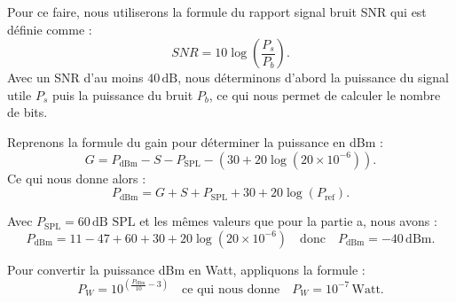 Pour ce faire, nous utiliserons la formule du rapport signal bruit SNR qui est définie comme :
\begin{equation}
SNR = 10 \log \left( \frac{P_s}{P_b} \right).
\end{equation}
Avec un SNR d'au moins \( 40 \, \text{dB} \), nous déterminons d'abord la puissance du signal utile \( P_s \) puis la puissance du bruit \( P_b \), ce qui nous permet de calculer le nombre de bits.

Reprenons la formule du gain pour déterminer la puissance en dBm :
\begin{equation}
G = P_{\text{dBm}} - S - P_{\text{SPL}} - \left( 30 + 20 \log \left( 20 \times 10^{-6} \right) \right).
\end{equation}
Ce qui nous donne alors :
\begin{equation}
P_{\text{dBm}} = G + S + P_{\text{SPL}} + 30 + 20 \log(P_{\text{ref}}).
\end{equation}

Avec \( P_{\text{SPL}} = 60 \, \text{dB SPL} \) et les mêmes valeurs que pour la partie a, nous avons :
\begin{equation}
P_{\text{dBm}} = 11 - 47 + 60 + 30 + 20 \log(20 \times 10^{-6}) \quad \text{donc} \quad P_{\text{dBm}} = -40 \, \text{dBm}.
\end{equation}

Pour convertir la puissance dBm en Watt, appliquons la formule :
\begin{equation}
P_W = 10^{\left( \frac{P_{\text{dBm}}}{10} - 3 \right)} \quad \text{ce qui nous donne} \quad P_W = 10^{-7} \, \text{Watt}.
\end{equation}

